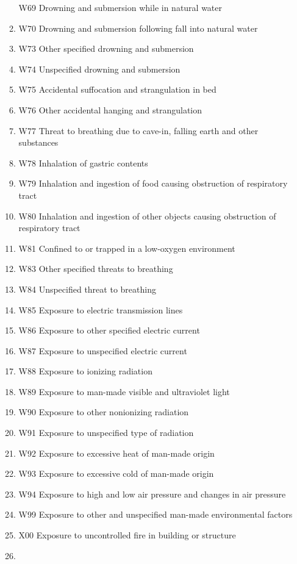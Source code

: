 \documentclass[
]{scrartcl}
\begin{document}
\begin{itemize}
\begin{enumerate}
    W69 Drowning and submersion while in natural water
  \item
    W70 Drowning and submersion following fall into natural water
  \item
    W73 Other specified drowning and submersion
  \item
    W74 Unspecified drowning and submersion
  \item
    W75 Accidental suffocation and strangulation in bed
  \item
    W76 Other accidental hanging and strangulation
  \item
    W77 Threat to breathing due to cave-in, falling earth and other
    substances
  \item
    W78 Inhalation of gastric contents
  \item
    W79 Inhalation and ingestion of food causing obstruction of
    respiratory tract
  \item
    W80 Inhalation and ingestion of other objects causing obstruction of
    respiratory tract
  \item
    W81 Confined to or trapped in a low-oxygen environment
  \item
    W83 Other specified threats to breathing
  \item
    W84 Unspecified threat to breathing
  \item
    W85 Exposure to electric transmission lines
  \item
    W86 Exposure to other specified electric current
  \item
    W87 Exposure to unspecified electric current
  \item
    W88 Exposure to ionizing radiation
  \item
    W89 Exposure to man-made visible and ultraviolet light
  \item
    W90 Exposure to other nonionizing radiation
  \item
    W91 Exposure to unspecified type of radiation
  \item
    W92 Exposure to excessive heat of man-made origin
  \item
    W93 Exposure to excessive cold of man-made origin
  \item
    W94 Exposure to high and low air pressure and changes in air
    pressure
  \item
    W99 Exposure to other and unspecified man-made environmental factors
  \item
    X00 Exposure to uncontrolled fire in building or structure
  \item

\end{enumerate}
\end{itemize}
\end{document}
